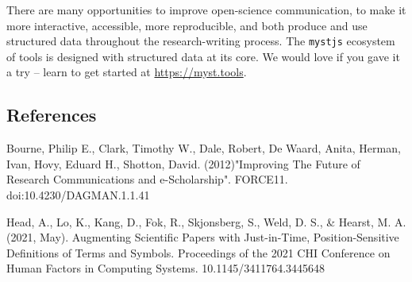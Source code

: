 \documentclass{article}
\begin{document}
There are many opportunities to improve open-science communication, to make it more interactive, accessible, more reproducible, and both produce and use structured data throughout the research-writing process. The \texttt{mystjs} ecosystem of tools is designed with structured data at its core. We would love if you gave it a try -- learn to get started at \url{https://myst.tools}.

\subsection{References}\label{References}

Bourne, Philip E., Clark, Timothy W., Dale, Robert, De Waard, Anita, Herman, Ivan, Hovy, Eduard H., Shotton, David. (2012)"Improving The Future of Research Communications and e-Scholarship". FORCE11. doi:10.4230/DAGMAN.1.1.41

Head, A., Lo, K., Kang, D., Fok, R., Skjonsberg, S., Weld, D. S., \& Hearst, M. A. (2021, May). Augmenting Scientific Papers with Just-in-Time, Position-Sensitive Definitions of Terms and Symbols. Proceedings of the 2021 CHI Conference on Human Factors in Computing Systems. 10.1145/3411764.3445648





\end{document}
